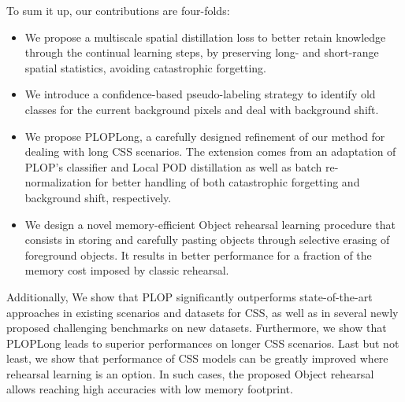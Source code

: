 To sum it up, our contributions are four-folds:
\begin{itemize}
    \item We propose a multiscale spatial distillation loss to better retain knowledge through the
          continual learning steps, by preserving long- and short-range spatial statistics, avoiding
          catastrophic forgetting.
    \item We introduce a confidence-based pseudo-labeling strategy to identify old classes for the
          current background pixels and deal with background shift.
    \item We propose PLOPLong, a carefully designed refinement of our method for dealing with long
          \ac{CSS} scenarios. The extension comes from an adaptation of PLOP's classifier and Local POD
          distillation as well as batch re-normalization for better handling of both catastrophic
          forgetting and background shift, respectively.
    \item We design a novel memory-efficient Object rehearsal learning procedure that consists in
          storing and carefully pasting objects through selective erasing of foreground objects. It
          results in better performance for a fraction of the memory cost imposed by classic
          rehearsal.
\end{itemize}

Additionally, We show that PLOP significantly outperforms state-of-the-art approaches in existing
scenarios and datasets for \ac{CSS}, as well as in several newly proposed challenging benchmarks on new
datasets. Furthermore, we show that PLOPLong leads to superior performances on longer \ac{CSS} scenarios.
Last but not least, we show that performance of \ac{CSS} models can be greatly improved where rehearsal
learning is an option. In such cases, the proposed Object rehearsal allows reaching high accuracies
with low memory footprint.

